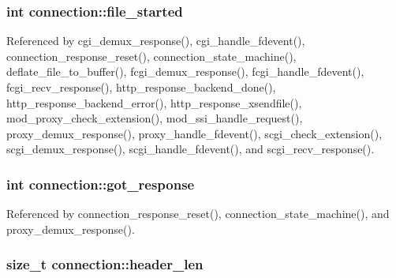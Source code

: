 \hypertarget{structconnection_a86f6550572fa72ac814b35df1d6b890b}{
\subsubsection[{file\-\_\-started}]{\setlength{\rightskip}{0pt plus 5cm}int connection\-::file\-\_\-started}}\label{structconnection_a86f6550572fa72ac814b35df1d6b890b}


Referenced by cgi\-\_\-demux\-\_\-response(), cgi\-\_\-handle\-\_\-fdevent(), connection\-\_\-response\-\_\-reset(), connection\-\_\-state\-\_\-machine(), deflate\-\_\-file\-\_\-to\-\_\-buffer(), fcgi\-\_\-demux\-\_\-response(), fcgi\-\_\-handle\-\_\-fdevent(), fcgi\-\_\-recv\-\_\-response(), http\-\_\-response\-\_\-backend\-\_\-done(), http\-\_\-response\-\_\-backend\-\_\-error(), http\-\_\-response\-\_\-xsendfile(), mod\-\_\-proxy\-\_\-check\-\_\-extension(), mod\-\_\-ssi\-\_\-handle\-\_\-request(), proxy\-\_\-demux\-\_\-response(), proxy\-\_\-handle\-\_\-fdevent(), scgi\-\_\-check\-\_\-extension(), scgi\-\_\-demux\-\_\-response(), scgi\-\_\-handle\-\_\-fdevent(), and scgi\-\_\-recv\-\_\-response().

\hypertarget{structconnection_a31bce9025d3e04d9df2e5876f4f1868a}{
\subsubsection[{got\-\_\-response}]{\setlength{\rightskip}{0pt plus 5cm}int connection\-::got\-\_\-response}}\label{structconnection_a31bce9025d3e04d9df2e5876f4f1868a}


Referenced by connection\-\_\-response\-\_\-reset(), connection\-\_\-state\-\_\-machine(), and proxy\-\_\-demux\-\_\-response().

\hypertarget{structconnection_a754a1fa8b70b9bc38d1dd924d379c34f}{
\subsubsection[{header\-\_\-len}]{\setlength{\rightskip}{0pt plus 5cm}size\-\_\-t connection\-::header\-\_\-len}}\label{structconnection_a754a1fa8b70b9bc38d1dd924d379c34f}


